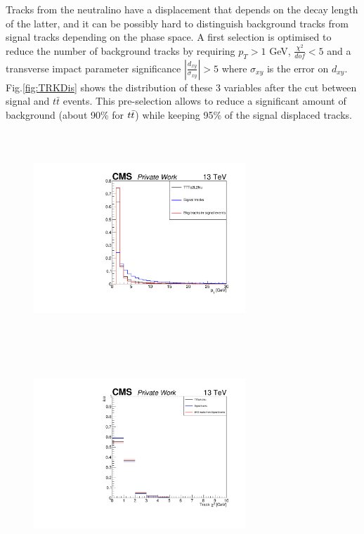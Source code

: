 \documentclass{cernatlasnote}
\begin{document}
Tracks from the neutralino have a displacement that depends on the decay length of the latter, and it can be possibly hard to distinguish background tracks from signal tracks depending on the phase space. A first selection is optimised to reduce the number of background tracks by requiring $p_T > 1$ GeV, $\frac{\chi^2}{dof} < 5$ and a transverse impact parameter significance $|\frac{d_{xy}}{\sigma_{xy}}| > 5$ where  $\sigma_{xy}$ is the error on $d_{xy}$. Fig.\ref{fig:TRKDis} shows the distribution of these 3 variables after the cut between signal and $t\bar{t}$ events. This pre-selection allows to reduce a significant amount of background (about 90\% for $t\Bar{t}$) while keeping 95\% of the signal displaced tracks. \\

        \begin{figure}[ht]
        \centering
        \includegraphics[height=8cm, width=8cm, trim= 0cm 0cm 0cm 0cm,clip]{images/TRK/Pt_TT.pdf}
        \includegraphics[height=8cm, width=8cm, trim= 0cm 0cm 0cm 0cm,clip]{images/TRK/Track_chi2.pdf}

\end{figure}
\end{document}
